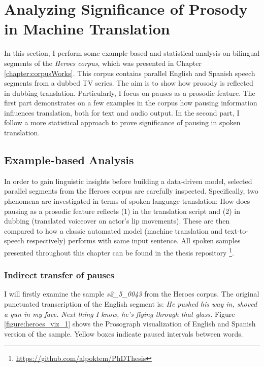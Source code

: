\section{Analyzing Significance of Prosody in Machine Translation}
\label{transProse:analysis}
In this section, I perform some example-based and statistical analysis on bilingual segments of the \textit{Heroes corpus}, which was presented in Chapter \ref{chapter:corpusWorks}. This corpus contains parallel English and Spanish speech segments from a dubbed TV series. The aim is to show how prosody is reflected in dubbing translation. Particularly, I focus on pauses as a prosodic feature. The first part demonstrates on a few examples in the corpus how pausing information influences translation, both for text and audio output. In the second part, I follow a more statistical approach to prove significance of pausing in spoken translation. 

\subsection{Example-based Analysis}
\label{subsection:heroes_examples}
In order to gain linguistic insights before building a data-driven model, selected parallel segments from the Heroes corpus are carefully inspected. Specifically, two phenomena are investigated in terms of spoken language translation: How does pausing as a prosodic feature reflects (1) in the translation script and (2) in dubbing (translated voiceover on actor's lip movements). These are then compared to how a classic automated model (machine translation and text-to-speech respectively) performs with same input sentence. All spoken samples presented throughout this chapter can be found in the thesis repository \footnote{\url{https://github.com/alpoktem/PhDThesis}}.

\subsubsection{Indirect transfer of pauses}

I will firstly examine the sample \textit{s2\_5\_0043} from the Heroes corpus. The original punctuated transcription of the English segment is: \textit{He pushed his way in, shoved a gun in my face. Next thing I know, he's flying through that glass.} Figure \ref{figure:heroes_viz_1} shows the Prosograph visualization of English and Spanish version of the sample. Yellow boxes indicate paused intervals between words.

